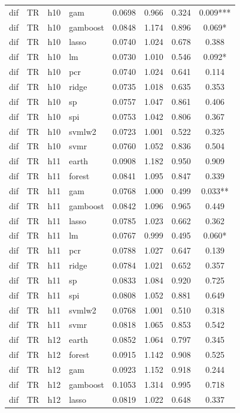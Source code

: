 \begin{ThreePartTable}
\begin{longtable}[t]{llclcccc}
dif & TR & h10 & gam & 0.0698 & 0.966 & 0.324 & 0.009***\\
dif & TR & h10 & gamboost & 0.0848 & 1.174 & 0.896 & 0.069*\\
dif & TR & h10 & lasso & 0.0740 & 1.024 & 0.678 & 0.388\\
dif & TR & h10 & lm & 0.0730 & 1.010 & 0.546 & 0.092*\\
dif & TR & h10 & pcr & 0.0740 & 1.024 & 0.641 & 0.114\\
dif & TR & h10 & ridge & 0.0735 & 1.018 & 0.635 & 0.353\\
dif & TR & h10 & sp & 0.0757 & 1.047 & 0.861 & 0.406\\
dif & TR & h10 & spi & 0.0753 & 1.042 & 0.806 & 0.367\\
dif & TR & h10 & svmlw2 & 0.0723 & 1.001 & 0.522 & 0.325\\
dif & TR & h10 & svmr & 0.0760 & 1.052 & 0.836 & 0.504\\
\addlinespace
dif & TR & h11 & earth & 0.0908 & 1.182 & 0.950 & 0.909\\
dif & TR & h11 & forest & 0.0841 & 1.095 & 0.847 & 0.339\\
dif & TR & h11 & gam & 0.0768 & 1.000 & 0.499 & 0.033**\\
dif & TR & h11 & gamboost & 0.0842 & 1.096 & 0.965 & 0.449\\
dif & TR & h11 & lasso & 0.0785 & 1.023 & 0.662 & 0.362\\
dif & TR & h11 & lm & 0.0767 & 0.999 & 0.495 & 0.060*\\
dif & TR & h11 & pcr & 0.0788 & 1.027 & 0.647 & 0.139\\
dif & TR & h11 & ridge & 0.0784 & 1.021 & 0.652 & 0.357\\
dif & TR & h11 & sp & 0.0833 & 1.084 & 0.920 & 0.725\\
dif & TR & h11 & spi & 0.0808 & 1.052 & 0.881 & 0.649\\
dif & TR & h11 & svmlw2 & 0.0768 & 1.001 & 0.510 & 0.318\\
dif & TR & h11 & svmr & 0.0818 & 1.065 & 0.853 & 0.542\\
\addlinespace
dif & TR & h12 & earth & 0.0852 & 1.064 & 0.797 & 0.345\\
dif & TR & h12 & forest & 0.0915 & 1.142 & 0.908 & 0.525\\
dif & TR & h12 & gam & 0.0923 & 1.152 & 0.918 & 0.244\\
dif & TR & h12 & gamboost & 0.1053 & 1.314 & 0.995 & 0.718\\
dif & TR & h12 & lasso & 0.0819 & 1.022 & 0.648 & 0.337\\

\end{longtable}
\end{ThreePartTable}
